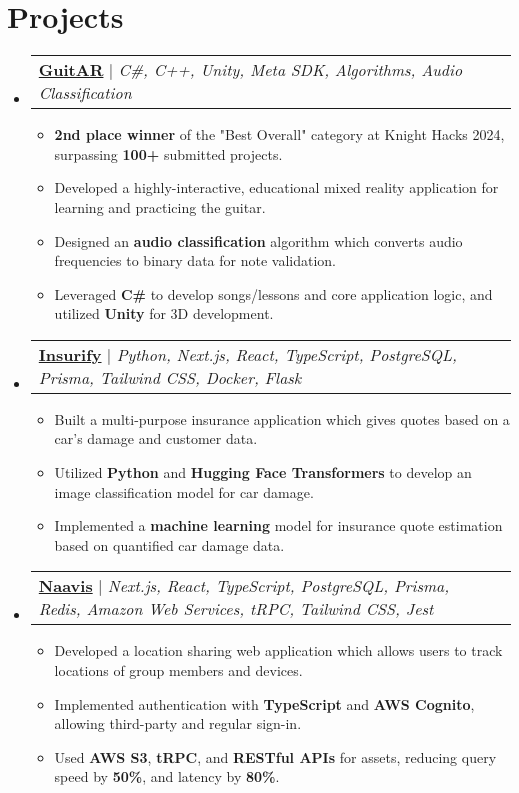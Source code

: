 \documentclass[letterpaper,11pt]{article}
\makeatletter
\newcommand{\resumeItem}[1]{
  \item\small{
    {#1 \vspace{-2pt}}
  }
}
\newcommand{\resumeProjectHeading}[2]{
    \item
    \begin{tabular*}{0.97\textwidth}{l@{\extracolsep{\fill}}r}
      \small#1\\
    \end{tabular*}\vspace{-7pt}
}
\newcommand{\resumeSubHeadingListStart}{\begin{itemize}[leftmargin=0.15in, label={}]}
\newcommand{\resumeSubHeadingListEnd}{\end{itemize}}
\newcommand{\resumeItemListStart}{\begin{itemize}}
\newcommand{\resumeItemListEnd}{\end{itemize}\vspace{-5pt}}
\makeatother
\begin{document}
\section{Projects}
    \resumeSubHeadingListStart
        \resumeProjectHeading
        {\textbf{\href{https://devpost.com/software/guitar-o3gw19}{GuitAR}} $|$ \emph{C\#, C++, Unity, Meta SDK, Algorithms, Audio Classification }}{June 2021 -- Present}
        \resumeItemListStart
          \resumeItem{\textbf{2nd place winner} of the "Best Overall" category at Knight Hacks 2024, surpassing \textbf{100+} submitted projects.}
          \resumeItem{Developed a highly-interactive, educational mixed reality application for learning and practicing the guitar.}
          \resumeItem{Designed an \textbf{audio classification} algorithm which converts audio frequencies to binary data for note validation.}
          \resumeItem{Leveraged \textbf{C\#} to develop songs/lessons and core application logic, and utilized \textbf{Unity} for 3D development.}
        \resumeItemListEnd
        \resumeProjectHeading
            {\textbf{\href{https://devpost.com/software/insurify-zj2dh4}{Insurify}} $|$ \emph{Python, Next.js, React, TypeScript, PostgreSQL, Prisma, Tailwind CSS, Docker, Flask}}{June 2021 -- Present}
          \resumeItemListStart
            \resumeItem{Built a multi-purpose insurance application which gives quotes based on a car's damage and customer data.}
            \resumeItem{Utilized \textbf{Python} and \textbf{Hugging Face Transformers} to develop an image classification model for car damage.}
            \resumeItem{Implemented a \textbf{machine learning} model for insurance quote estimation based on quantified car damage data.}
          \resumeItemListEnd
      \resumeProjectHeading
          {\textbf{\href{https://github.com/naavis-app/app}{Naavis}} $|$ \emph{Next.js, React, TypeScript, PostgreSQL, Prisma, Redis, Amazon Web Services, tRPC, Tailwind CSS, Jest}}{June 2021 -- Present}
          \resumeItemListStart
            \resumeItem{Developed a location sharing web application which allows users to track locations of group members and devices.}
            \resumeItem{Implemented authentication with \textbf{TypeScript} and \textbf{AWS Cognito}, allowing third-party and regular sign-in.}
            \resumeItem{Used \textbf{AWS S3}, \textbf{tRPC}, and \textbf{RESTful APIs} for assets, reducing query speed by \textbf{50\%}, and latency by \textbf{80\%}.}
          \resumeItemListEnd
    \resumeSubHeadingListEnd
%

\end{document}
